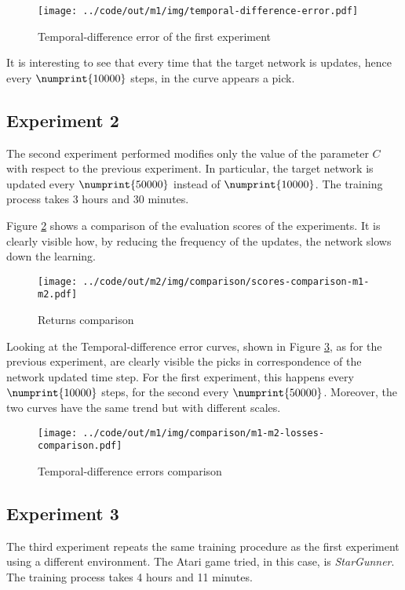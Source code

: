 \documentclass[a4paper,12pt]{article} %
\begin{document}
	\begin{figure}[htb]
		\centering
		\texttt{[image: ../code/out/m1/img/temporal-difference-error.pdf]}	
		\caption{Temporal-difference error of the first experiment}
		\label{fig:loss-m1}
	\end{figure} 

	It is interesting to see that every time that the target network is updates, hence every $\numprint{10000}$ steps, in the curve appears a pick.

	\subsection*{Experiment 2}
	The second experiment performed modifies only the value of the parameter $C$ with respect to the previous experiment. In particular, the target network is updated every $\numprint{50000}$ instead of $\numprint{10000}$. The training process takes 3 hours and 30 minutes. 
	\bigskip
	
	Figure \ref{fig:score-m1-m2} shows a comparison of the evaluation scores of the experiments. It is clearly visible how, by reducing the frequency of the updates, the network slows down the learning.
	
	\begin{figure}[htb]
		\centering
		\texttt{[image: ../code/out/m2/img/comparison/scores-comparison-m1-m2.pdf]}	
		\caption{Returns comparison}
		\label{fig:score-m1-m2}
	\end{figure}
	\bigskip
	
	Looking at the Temporal-difference error curves, shown in Figure \ref{fig:loss-m1-m2}, as for the previous experiment, are clearly visible the picks in correspondence of the network updated time step. For the first experiment, this happens every $\numprint{10000}$ steps, for the second every $\numprint{50000}$. Moreover, the two curves have the same trend but with different scales.
	
	\begin{figure}[H]
		\centering
		\texttt{[image: ../code/out/m1/img/comparison/m1-m2-losses-comparison.pdf]}	
		\caption{Temporal-difference errors comparison}
		\label{fig:loss-m1-m2}
	\end{figure}
	
	\subsection*{Experiment 3}
	The third experiment repeats the same training procedure as the first experiment using a different environment. The Atari game tried, in this case, is \textit{StarGunner}. The training process takes 4 hours and 11 minutes.
	
\end{document}
